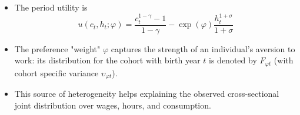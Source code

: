 \documentclass[notes=show]{beamer}
\begin{document}
\bigskip

\begin{frame}%


\begin{itemize}
\item The period utility is%
\begin{equation}
u\left( c_{t},h_{t};\varphi \right) =\frac{c_{t}^{1-\gamma }-1}{1-\gamma }%
-\exp \left( \varphi \right) \frac{h_{t}^{1+\sigma }}{1+\sigma }
\end{equation}

\item The preference "weight" $\varphi $ captures the strength of an
individual's aversion to work: its distribution for the cohort with birth
year $t$ is denoted by $F_{\varphi t}$ (with cohort specific variance $%
\upsilon _{\varphi t}$).

\item This source of heterogeneity helps explaining the observed
cross-sectional joint distribution over wages, hours, and consumption.
\end{itemize}

\transboxout%
\end{frame}%

\bigskip
\end{document}
